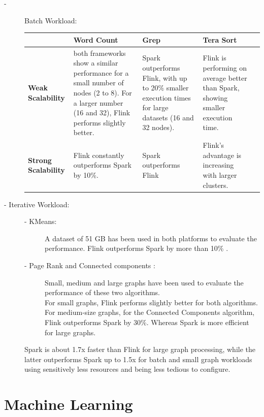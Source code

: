 \begin{description}
\item[- ] Batch Workload:\\

\begin{tabular}{|l|p{3.5cm}|p{3.5cm}|p{3.5cm}|p{2cm}|}
    \hline
      & \textbf{Word Count} & \textbf{Grep} & \textbf{Tera Sort}\tabularnewline 
    \hline 
      \textbf{Weak Scalability} & both frameworks show a similar performance for a small number of nodes (2 to 8).  
      				   For a larger number (16 and 32), Flink performs slightly better. 
      				  & Spark outperforms Flink, with up to 20\% smaller execution times for large datasets (16 and 						32 nodes).
 						& Flink is performing on average better than Spark, showing smaller execution time. \tabularnewline 
     \hline 
      \textbf{Strong Scalability} & Flink constantly outperforms Spark by 10\%. 
      					 & Spark outperforms Flink  
      					 & Flink’s advantage is increasing with larger clusters. \tabularnewline 
     \hline
 \end{tabular}
     \item[- Iterative Workload:]     
     \begin{description}
     \item[- KMeans: ] 
     A dataset of 51 GB has been used in both platforms to evaluate the performance. Flink outperforms Spark by more than 10\% .
	\item[- Page Rank and Connected components : ] 
 Small, medium and large graphs have been used to evaluate the performance of these two algorithms.\\
 For small graphs, Flink performs slightly better for both algorithms. For medium-size graphs, for the Connected Components algorithm, Flink outperforms Spark by 30\%. Whereas Spark is more efficient for large graphs.
   \end{description}
 
Spark is about 1.7x faster than Flink for large graph processing, while the latter outperforms Spark up to 1.5x for batch and small graph workloads using sensitively less resources and being less tedious to configure. 

 \end{description}    
\section{Machine Learning}

